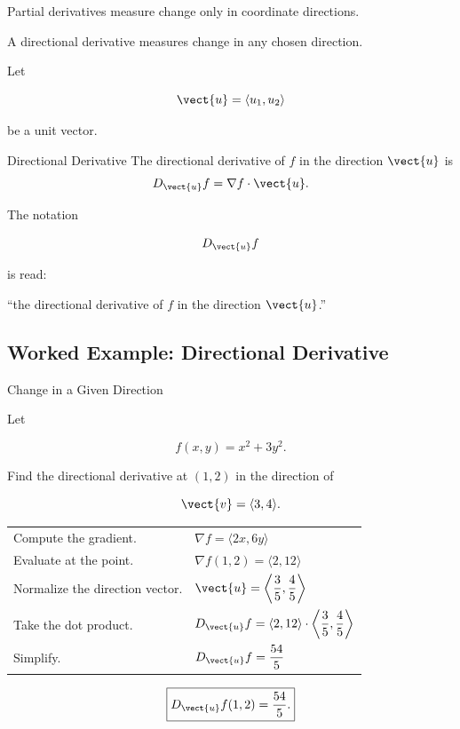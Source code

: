 Partial derivatives measure change only in coordinate directions.

A directional derivative measures change in any chosen direction.

Let

\[ \vect{u}=\langle u_1,u_2\rangle \]

be a unit vector.

\begin{definitionbox}{Directional Derivative}
The directional derivative of \(f\) in the direction \(\vect{u}\) is
\[ D_{\vect{u}}f
=
\nabla f\cdot\vect{u}. \]
\end{definitionbox}

The notation

\[ D_{\vect{u}}f \]

is read:

``the directional derivative of \(f\) in the direction \(\vect{u}\).''

\subsection{Worked Example: Directional Derivative}
\label{subsec:worked-directional-derivative}

\begin{workedexamplebox}{Change in a Given Direction}

Let

\[ f(x,y)=x^2+3y^2. \]

Find the directional derivative at \((1,2)\) in the direction of

\[ \vect{v}=\langle3,4\rangle. \]

\begin{tabularx}{\textwidth}{@{}>{\raggedright\arraybackslash}p{}X@{}}
Compute the gradient. &
\(\nabla f=\langle2x,6y\rangle\)\\
Evaluate at the point. &
\(\nabla f(1,2)=\langle2,12\rangle\)\\
Normalize the direction vector. &
\(\displaystyle \vect{u}=\left\langle\frac35,\frac45\right\rangle\)\\
Take the dot product. &
\(\displaystyle D_{\vect{u}}f
=\langle2,12\rangle\cdot
\left\langle\frac35,\frac45\right\rangle\)\\
Simplify. &
\(\displaystyle D_{\vect{u}}f=\frac{54}{5}\)
\end{tabularx}

\begin{answerbox}
\[ \boxed{D_{\vect{u}}f(1,2)=\frac{54}{5}.} \]
\end{answerbox}
\end{workedexamplebox}

